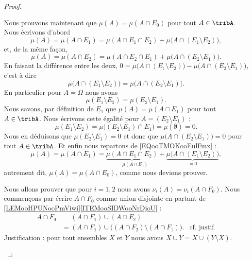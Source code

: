 \begin{proof}
\begin{subproof}
		\spitem[\( \mu(A)=\mu(A\cap E_0)\)]
		Nous prouvons maintenant que \( \mu(A)=\mu(A\cap E_0)\) pour tout \( A\in\tribA\). Nous écrivons d'abord
		\begin{equation}	\label{EQooTMOKooEulFmx}
			\mu(A)=\mu(A\cap E_1)=\mu(A\cap E_1\cap E_2)+\mu\big( A\cap(E_1\setminus E_2) \big),
		\end{equation}
		et, de la même façon,
		\begin{equation}
			\mu(A)=\mu(A\cap E_2)=\mu(A\cap E_2\cap E_1)+\mu\big( A\cap(E_2\setminus E_1) \big).
		\end{equation}
		En faisant la différence entre les deux, \( 0=\mu\big( A\cap(E_1\setminus E_2) \big)-\mu\big( A\cap(E_2\setminus E_1) \big)\), c'est à dire
		\begin{equation}
			\mu\big( A\cap(E_1\setminus E_2) \big)=\mu\big( A\cap(E_2\setminus E_1) \big).
		\end{equation}
		En particulier pour \( A=\Omega\) nous avons
		\begin{equation}
			\mu(E_1\setminus E_2)=\mu(E_2\setminus E_1).
		\end{equation}
		Nous savons, par définition de \( E_1\) que \( \mu(A)=\mu(A\cap E_1)\) pour tout \( A\in\tribA\). Nous écrivons cette égalité pour \( A=(E_2\setminus E_1)\) :
		\begin{equation}
			\mu(E_1\setminus E_2)=\mu\big( (E_2\setminus E_1)\cap E_1 \big)=\mu(\emptyset)=0.
		\end{equation}
		Nous en déduisons que \( \mu(E_2\setminus E_1)=0\) et donc que \( \mu\big( A\cap(E_2\setminus E_1) \big)=0\) pour tout \( A\in\tribA\). Et enfin nous repartons de \eqref{EQooTMOKooEulFmx} :
		\begin{equation}
			\mu(A)=\mu(A\cap E_1)=\underbrace{\mu(A\cap E_1\cap E_2)}_{=\mu(A\cap E_0)}+\underbrace{\mu\big( A\cap(E_1\setminus E_2) \big)}_{=0},
		\end{equation}
		autrement dit, \( \mu(A)=\mu(A\cap E_0)\), comme nous devions prouver.

		\spitem[\( \nu_i(A)=\nu_i(A\cap F_0)\)]
		Nous allons prouver que pour \( i=1,2\) nous avons \( \nu_i(A)=\nu_i(A\cap F_0)\). Nous commençons par écrire \( A\cap F_0\) comme union disjointe en partant de \ref{LEMooHPUNooPmViwi}\ref{ITEMooSIDWooNrDjoU} :
		\begin{subequations}
			\begin{align}
				A\cap F_0 & =(A\cap F_1)\cup (A\cap F_2)                                                       \\
				          & =(A\cap F_1)\cup\big( (A\cap F_2)\setminus (A\cap F_1) \big). & \text{cf. justif.}
			\end{align}
		\end{subequations}
		Justification : pour tout ensembles \( X\) et \( Y\) nous avons \( X\cup Y=X\cup(Y\setminus X)\).


\end{subproof}
\end{proof}
